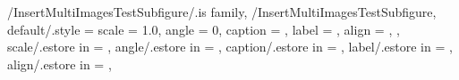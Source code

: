 {
} %

\pgfkeys
{
  /InsertMultiImagesTestSubfigure/.is family, /InsertMultiImagesTestSubfigure,
  default/.style = 
  {
    scale = 1.0,
    angle = 0,
    caption = \empty,
    label = \empty,
    align = \empty,
  },
  scale/.estore in = \InsertMultiImagesTestSubfigureValueScale,
  angle/.estore in = \InsertMultiImagesTestSubfigureValueAngle,
  caption/.estore in = \InsertMultiImagesTestSubfigureValueCaption,
  label/.estore in = \InsertMultiImagesTestSubfigureValueLabel,
  align/.estore in = \InsertMultiImagesTestSubfigureValueAlign,
} %

\newcommand{\InsertMultiImagesTestSubfigure}[2][\empty]
{
  \SetWidthOfImagePerRow
  \pgfkeys{/InsertMultiImagesTestSubfigure, default, #1}
  \begin{subfigure}[b]{\WidthOfImagePerRow\textwidth}
    \center
    \includegraphics[
      scale=\InsertMultiImagesTestSubfigureValueScale,
      angle=\InsertMultiImagesTestSubfigureValueAngle]
      {#2}
    \SetImageCaption{\InsertMultiImagesTestSubfigureValueCaption}
    \ifthenelse{\equal{\InsertMultiImagesTestSubfigureValueCaption}{\empty}}
      {}{\SetImageLabel{\InsertMultiImagesTestSubfigureValueLabel}}
  \end{subfigure}%
} %


